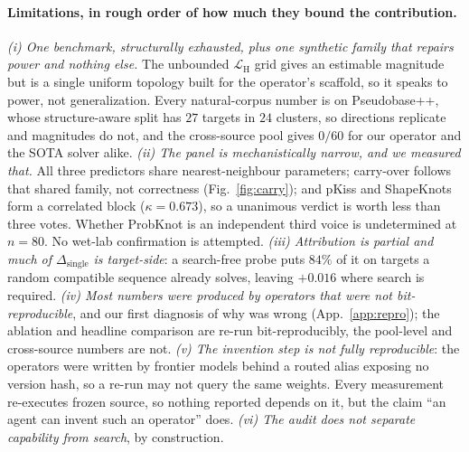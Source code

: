 \documentclass[11pt]{article}
\begin{document}
\paragraph{Limitations, in rough order of how much they bound the contribution.} \emph{(i) One benchmark,
structurally exhausted, plus one synthetic family that repairs power and nothing else.} The unbounded
$\mathcal L_{\mathrm H}$ grid gives an estimable magnitude but is a single uniform topology built for the
operator's scaffold, so it speaks to power, not generalization. Every natural-corpus number is on
Pseudobase++, whose structure-aware split has $27$ targets in $24$ clusters, so directions replicate and
magnitudes do not, and the cross-source pool gives $0/60$ for our operator and the SOTA solver alike.
\emph{(ii) The panel is mechanistically narrow, and we measured that.} All three predictors share
nearest-neighbour parameters; carry-over follows that shared family, not correctness (Fig.~\ref{fig:carry});
and pKiss and ShapeKnots form a correlated block ($\kappa=0.673$), so a unanimous verdict is worth less than
three votes. Whether ProbKnot is an independent third voice is undetermined at $n{=}80$. No wet-lab
confirmation is attempted. \emph{(iii) Attribution is partial and much of $\Delta_{\mathrm{single}}$ is
target-side}: a search-free probe puts $84\%$ of it on targets a random compatible sequence already solves,
leaving ${+}0.016$ where search is required. \emph{(iv) Most numbers were produced by operators that were not
bit-reproducible}, and our first diagnosis of why was wrong (App.~\ref{app:repro}); the ablation and headline
comparison are re-run bit-reproducibly, the pool-level and cross-source numbers are not. \emph{(v) The
invention step is not fully reproducible}: the operators were written by frontier models behind a routed alias
exposing no version hash, so a re-run may not query the same weights. Every measurement re-executes frozen
source, so nothing reported depends on it, but the claim ``an agent can invent such an operator'' does.
\emph{(vi) The audit does not separate capability from search}, by construction.
\end{document}
